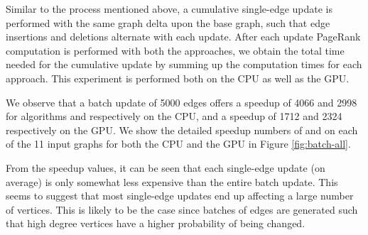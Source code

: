Similar to the process mentioned above, a cumulative single-edge update is performed with the same graph delta upon the base graph, such that edge insertions and deletions alternate with each update. After each update PageRank computation is performed with both the approaches, we obtain the total time needed for the cumulative update by summing up the computation times for each approach. This experiment is performed both on the CPU as well as the GPU.

We observe that a batch update of 5000 edges offers a speedup of {4066\x} and {2998\x} for algorithms \monolithicPR{} and \levelwisePR{} respectively on the CPU, and a speedup of {1712\x} and {2324\x} respectively on the GPU. We show the detailed speedup numbers of  \monolithicPR{} and \levelwisePR{} on each of the 11 input graphs for both the CPU and the GPU in Figure \ref{fig:batch-all}.

From the speedup values, it can be seen that each single-edge update (on average) is only somewhat less expensive than the entire batch update. This seems to suggest that most single-edge updates end up affecting a large number of vertices. This is likely to be the case since batches of edges are generated such that high degree vertices have a higher probability of being changed.








